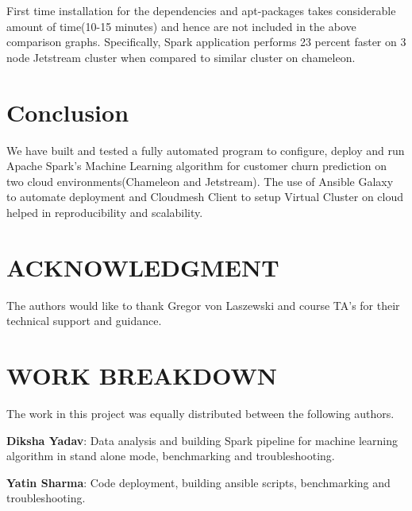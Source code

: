 \documentclass[9pt,twocolumn,twoside]{../../styles/osajnl}
\begin{document}
	First time installation for the dependencies and apt-packages takes considerable amount of time(10-15 minutes) and hence are not included in the above comparison graphs. Specifically, Spark application performs 23 percent faster on 3 node Jetstream cluster when compared to similar cluster on chameleon.
\section{Conclusion}
	We have built and tested a fully automated program to configure, deploy and run Apache Spark's Machine Learning algorithm for customer churn prediction on two cloud environments(Chameleon and Jetstream). The use of Ansible Galaxy to automate deployment and Cloudmesh Client to setup Virtual Cluster on cloud helped in reproducibility and scalability.


\section{ACKNOWLEDGMENT}
	The authors would like to thank Gregor von Laszewski and course TA's for their technical support and guidance.
	
\section{WORK BREAKDOWN}
	The work in this project was equally distributed between the following authors.
	
	\textbf{Diksha Yadav}: Data analysis and building   Spark pipeline for machine learning algorithm in stand alone mode, benchmarking and troubleshooting.
	
	\textbf{Yatin Sharma}: Code deployment, building ansible scripts, benchmarking and troubleshooting.


\end{document}
